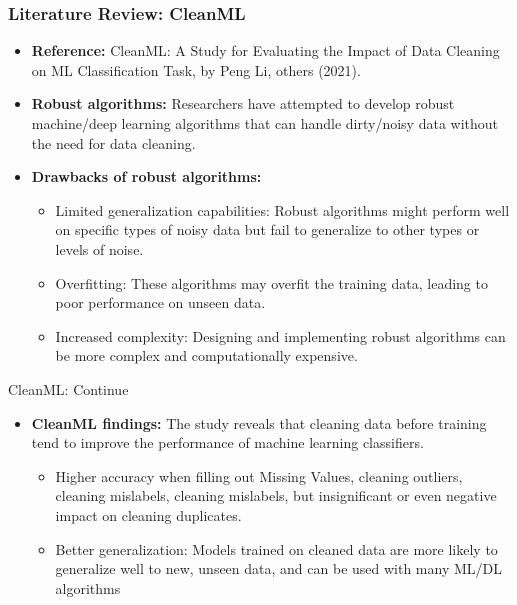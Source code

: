 \documentclass{beamer}
\begin{document}
\begin{frame}
\frametitle{Literature Review: CleanML}

\begin{itemize}
\item \textbf{Reference:} CleanML: A Study for Evaluating the Impact of Data Cleaning on ML Classification Task, by Peng Li, others (2021).

\item \textbf{Robust algorithms:} Researchers have attempted to develop robust machine/deep learning algorithms that can handle dirty/noisy data without the need for data cleaning.

\item \textbf{Drawbacks of robust algorithms:}
\begin{itemize}
\item Limited generalization capabilities: Robust algorithms might perform well on specific types of noisy data but fail to generalize to other types or levels of noise.

\item Overfitting: These algorithms may overfit the training data, leading to poor performance on unseen data.

\item Increased complexity: Designing and implementing robust algorithms can be more complex and computationally expensive.
\end{itemize}

\end{itemize}

\end{frame}

\begin{frame}{CleanML: Continue}
\begin{itemize}
    \item \textbf{CleanML findings:} The study reveals that cleaning data before training tend to improve the performance of machine learning classifiers.
\begin{itemize}
\item Higher accuracy when filling out Missing Values, cleaning outliers, cleaning mislabels, cleaning mislabels, but insignificant or even negative impact on cleaning duplicates.

\item Better generalization: Models trained on cleaned data are more likely to generalize well to new, unseen data, and can be used with many ML/DL algorithms

\end{itemize}
\end{itemize}
    
\end{frame}
\end{document}
